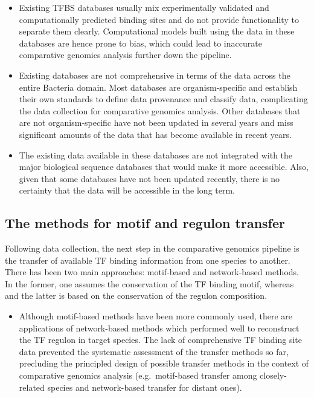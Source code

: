\begin{itemize}
\item Existing TFBS databases usually mix experimentally validated and
  computationally predicted binding sites and do not provide functionality to
  separate them clearly. Computational models built using the data in these
  databases are hence prone to bias, which could lead to inaccurate comparative
  genomics analysis further down the pipeline.

\item Existing databases are not comprehensive in terms of the data across the
  entire Bacteria domain. Most databases are organism-specific and establish
  their own standards to define data provenance and classify data, complicating
  the data collection for comparative genomics analysis. Other databases that
  are not organism-specific have not been updated in several years and miss
  significant amounts of the data that has become available in recent years.

\item The existing data available in these databases are not integrated with
  the major biological sequence databases that would make it more
  accessible. Also, given that some databases have not been updated recently,
  there is no certainty that the data will be accessible in the long term.
\end{itemize}

\subsection{The methods for motif and regulon transfer}
Following data collection, the next step in the comparative genomics pipeline
is the transfer of available TF binding information from one species to
another. There has been two main approaches: motif-based and network-based
methods. In the former, one assumes the conservation of the TF binding motif,
whereas and the latter is based on the conservation of the regulon composition.

\begin{itemize}
\item Although motif-based methods have been more commonly used, there are
  applications of network-based methods which performed well to reconstruct the
  TF regulon in target species. The lack of comprehensive TF binding site data
  prevented the systematic assessment of the transfer methods so far,
  precluding the principled design of possible transfer methods in the context
  of comparative genomics analysis (e.g.\ motif-based transfer among
  closely-related species and network-based transfer for distant ones).
\end{itemize}

